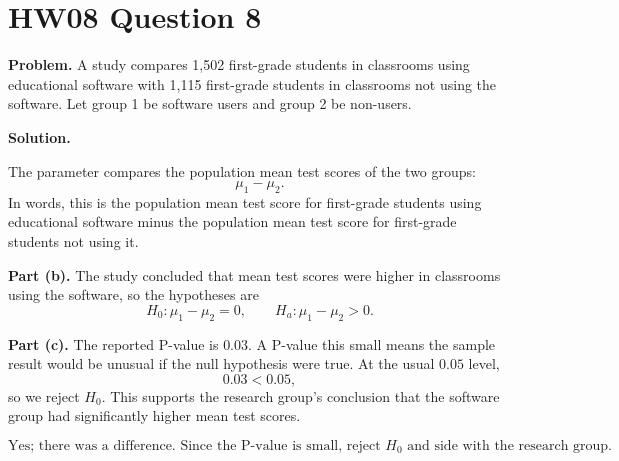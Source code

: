 \documentclass[11pt]{article}
\begin{document}
\section*{HW08 Question 8}

\textbf{Problem.} A study compares 1,502 first-grade students in classrooms using educational software with 1,115 first-grade students in classrooms not using the software. Let group 1 be software users and group 2 be non-users.

\textbf{Solution.}

The parameter compares the population mean test scores of the two groups:
\[
\boxed{\mu_1-\mu_2}.
\]
In words, this is the population mean test score for first-grade students using educational software minus the population mean test score for first-grade students not using it.

\textbf{Part (b).} The study concluded that mean test scores were higher in classrooms using the software, so the hypotheses are
\[
H_0:\mu_1-\mu_2=0,\qquad H_a:\mu_1-\mu_2>0.
\]

\textbf{Part (c).} The reported P-value is \(0.03\). A P-value this small means the sample result would be unusual if the null hypothesis were true. At the usual \(0.05\) level,
\[
0.03<0.05,
\]
so we reject \(H_0\). This supports the research group's conclusion that the software group had significantly higher mean test scores.

\[
\boxed{\text{Yes; there was a difference. Since the P-value is small, reject }H_0\text{ and side with the research group.}}
\]
\end{document}
